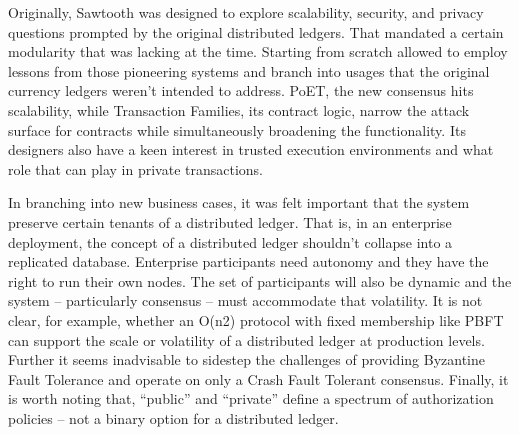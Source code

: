 Originally, Sawtooth was designed to explore scalability, security, and privacy questions prompted by the original distributed ledgers. That mandated a certain modularity that was lacking at the time. Starting from scratch allowed to employ lessons from those pioneering systems and branch into usages that the original currency ledgers weren't intended to address. PoET, the new consensus hits scalability, while Transaction Families, its contract logic, narrow the attack surface for contracts while simultaneously broadening the functionality. Its designers also have a keen interest in trusted execution environments and what role that can play in private transactions.

In branching into new business cases, it was felt important that the system preserve certain tenants of a distributed ledger. That is, in an enterprise deployment, the concept of a distributed ledger shouldn't collapse into a replicated database. Enterprise participants need autonomy and they have the right to run their own nodes. The set of participants will also be dynamic and the system – particularly consensus – must accommodate that volatility. It is not clear, for example, whether an O(n2) protocol with fixed membership like PBFT can support the scale or volatility of a distributed ledger at production levels. Further it seems inadvisable to sidestep the challenges of providing Byzantine Fault Tolerance and operate on only a Crash Fault Tolerant consensus. Finally, it is worth noting that, “public” and “private” define a spectrum of authorization policies – not a binary option for a distributed ledger.
